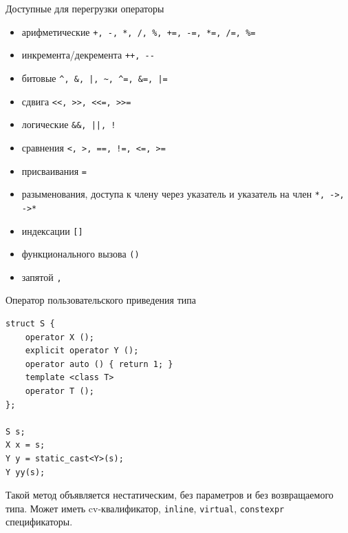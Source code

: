\documentclass[unknownkeysallowed,xcolor=table]{beamer}
\begin{document}
\begin{frame}[fragile]{Доступные для перегрузки операторы}

\begin{itemize}
  \item арифметические \lstinline{+, -, *, /, %, +=, -=, *=, /=, %=}
  \item инкремента/декремента \lstinline{++, --}
  \item битовые \lstinline{^, &, |, ~, ^=, &=, |=}
  \item сдвига \lstinline{<<, >>, <<=, >>=}
  \item логические \lstinline{&&, ||, !}
  \item сравнения \lstinline{<, >, ==, !=, <=, >=}
  \item присваивания \lstinline{=}
  \item разыменования, доступа к члену через указатель и указатель на член \lstinline{*, ->, ->*}
  \item индексации \lstinline{[]}
  \item функционального вызова \lstinline{()}
  \item запятой \lstinline{,}
\end{itemize}

\end{frame}

\begin{frame}[fragile]{Оператор пользовательского приведения типа}

\begin{lstlisting}
struct S {
    operator X ();
    explicit operator Y ();
    operator auto () { return 1; }
    template <class T>
    operator T ();
};

S s;
X x = s;
Y y = static_cast<Y>(s);
Y yy(s);
\end{lstlisting}

\vspace{0.5em}

Такой метод объявляется нестатическим, без параметров и без возвращаемого типа. Может иметь cv-квалификатор, \lstinline{inline}, \lstinline{virtual}, \lstinline{constexpr} спецификаторы.

\end{frame}
\end{document}
